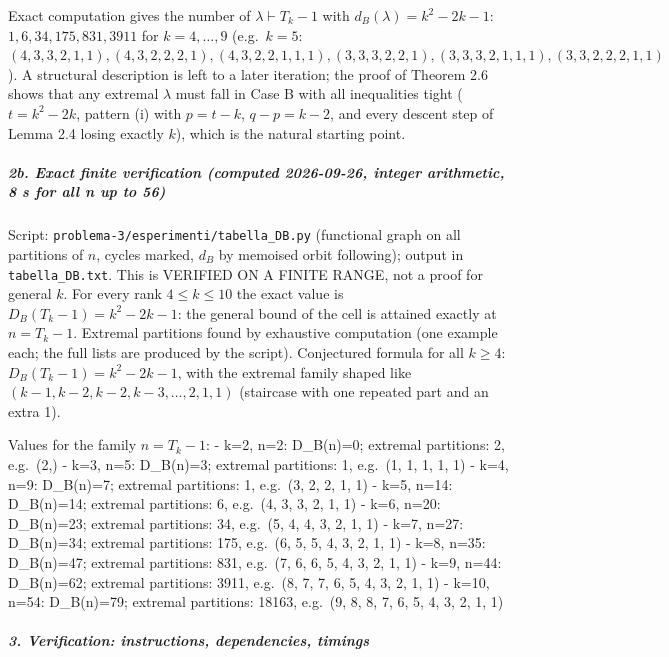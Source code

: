 \documentclass[11pt,a4paper]{article}
\begin{document}
Exact computation gives the number of \(\lambda\vdash T_k-1\) with
\(d_B(\lambda)=k^2-2k-1\): \(1,6,34,175,831,3911\) for \(k=4,\dots,9\)
(e.g.~\(k=5\):
\((4,3,3,2,1,1),(4,3,2,2,2,1),(4,3,2,2,1,1,1),(3,3,3,2,2,1),(3,3,3,2,1,1,1),(3,3,2,2,2,1,1)\)).
A structural description is left to a later iteration; the proof of
Theorem 2.6 shows that any extremal \(\lambda\) must fall in Case B with
all inequalities tight (\(t=k^2-2k\), pattern (i) with \(p=t-k\),
\(q-p=k-2\), and every descent step of Lemma 2.4 losing exactly \(k\)),
which is the natural starting point.

\subparagraph{2b. Exact finite verification (computed 2026-09-26,
integer arithmetic, 8 s for all n up to
56)}\label{b.-exact-finite-verification-computed-2026-09-26-integer-arithmetic-8-s-for-all-n-up-to-56}

Script: \texttt{problema-3/esperimenti/tabella\_DB.py} (functional graph
on all partitions of \(n\), cycles marked, \(d_B\) by memoised orbit
following); output in \texttt{tabella\_DB.txt}. This is VERIFIED ON A
FINITE RANGE, not a proof for general \(k\). For every rank
\(4\le k\le 10\) the exact value is \(D_B(T_k-1)=k^2-2k-1\): the general
bound of the cell is attained exactly at \(n=T_k-1\). Extremal
partitions found by exhaustive computation (one example each; the full
lists are produced by the script). Conjectured formula for all
\(k\ge4\): \(D_B(T_k-1)=k^2-2k-1\), with the extremal family shaped like
\((k-1,k-2,k-2,k-3,\dots,2,1,1)\) (staircase with one repeated part and
an extra 1).

Values for the family \(n=T_k-1\): - k=2, n=2: D\_B(n)=0; extremal
partitions: 2, e.g.~(2,) - k=3, n=5: D\_B(n)=3; extremal partitions: 1,
e.g.~(1, 1, 1, 1, 1) - k=4, n=9: D\_B(n)=7; extremal partitions: 1,
e.g.~(3, 2, 2, 1, 1) - k=5, n=14: D\_B(n)=14; extremal partitions: 6,
e.g.~(4, 3, 3, 2, 1, 1) - k=6, n=20: D\_B(n)=23; extremal partitions:
34, e.g.~(5, 4, 4, 3, 2, 1, 1) - k=7, n=27: D\_B(n)=34; extremal
partitions: 175, e.g.~(6, 5, 5, 4, 3, 2, 1, 1) - k=8, n=35: D\_B(n)=47;
extremal partitions: 831, e.g.~(7, 6, 6, 5, 4, 3, 2, 1, 1) - k=9, n=44:
D\_B(n)=62; extremal partitions: 3911, e.g.~(8, 7, 7, 6, 5, 4, 3, 2, 1,
1) - k=10, n=54: D\_B(n)=79; extremal partitions: 18163, e.g.~(9, 8, 8,
7, 6, 5, 4, 3, 2, 1, 1)

\subparagraph{3. Verification: instructions, dependencies,
timings}\label{verification-instructions-dependencies-timings}
\end{document}
